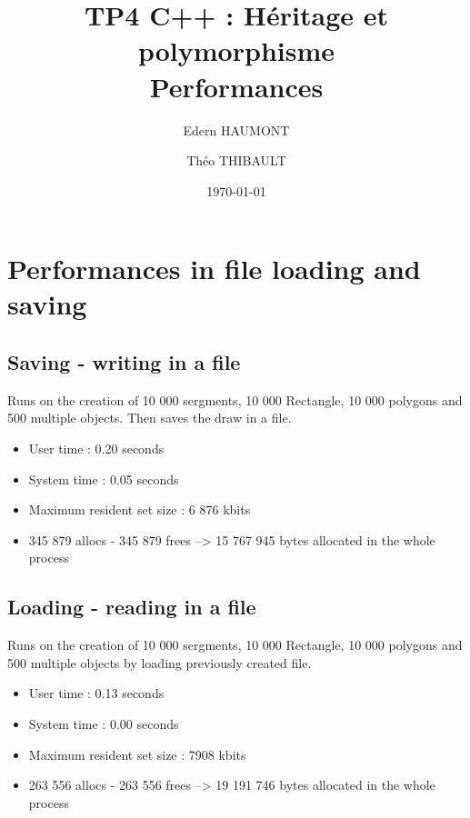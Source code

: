 \documentclass[a4paper, 12pts]{article}
\title{TP4 C++ : Héritage et polymorphisme \\
    \large Performances}
\author{Edern HAUMONT}
\author{Théo THIBAULT}
\affil{B3133}
\date{\today}
\begin{document}

\maketitle



\section{Performances in file loading and saving}

    \subsection{Saving - writing in a file}
    Runs on the creation of 10 000 sergments, 10 000 Rectangle, 10 000 polygons and 500 multiple objects. Then saves the draw in a file.
        \begin{itemize}
            \item User time : 0.20 seconds
            \item System time : 0.05 seconds
            \item Maximum resident set size : 6 876 kbits
            \item 345 879 allocs - 345 879 frees --> 15 767 945 bytes allocated in the whole process
        \end{itemize}

\subsection{Loading - reading in a file}
    Runs on the creation of 10 000 sergments, 10 000 Rectangle, 10 000 polygons and 500 multiple objects by loading previously created file.
        \begin{itemize}
            \item User time : 0.13 seconds
            \item System time : 0.00 seconds
            \item Maximum resident set size : 7908 kbits
            \item 263 556 allocs - 263 556 frees --> 19 191 746 bytes allocated in the whole process
        \end{itemize}
\end{document}
